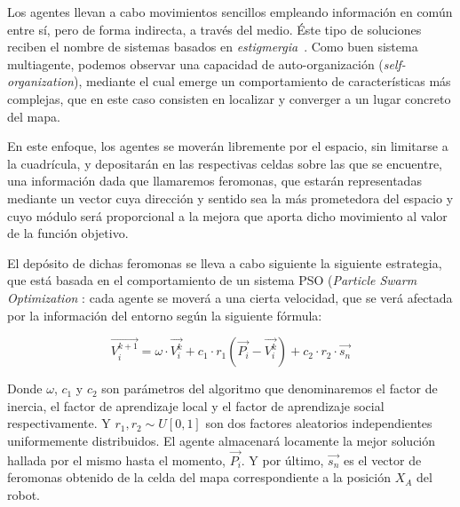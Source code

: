 \documentclass[runningheads]{llncs}
\begin{document}
    Los agentes llevan a cabo movimientos sencillos empleando información en común entre sí, pero de forma indirecta,
    a través del medio. Éste tipo de soluciones reciben el nombre de sistemas basados en
    \textit{estigmergia}~\cite{stigmergy}.
    Como buen sistema multiagente, podemos observar una capacidad de auto-organización (\textit{self-organization}),
    mediante el cual emerge un comportamiento de características más complejas, que en este caso consisten en localizar
    y converger a un lugar concreto del mapa.

    En este enfoque, los agentes se moverán libremente por el espacio, sin limitarse a la cuadrícula, y depositarán
    en las respectivas celdas sobre las que se encuentre, una información dada que llamaremos feromonas, que estarán
    representadas mediante un vector cuya dirección y sentido sea la más prometedora del espacio y cuyo módulo será
    proporcional a la mejora que aporta dicho movimiento al valor de la función objetivo.

    El depósito de dichas feromonas se lleva a cabo siguiente la siguiente estrategia, que está basada en el
    comportamiento de un sistema PSO (\textit{Particle Swarm Optimization} \cite{PSO}: cada agente se moverá a una
    cierta velocidad, que se verá afectada por la información del entorno según la siguiente fórmula:


    \[
        \vec{V_i^{k+1}} = \omega \cdot \vec{V_i^k} + c_1 \cdot r_1(\vec{P_i} - \vec{V_i^k}) + c_2 \cdot r_2 \cdot \vec{s_n}
    \]

    Donde $\omega$, $c_1$ y $c_2$ son parámetros del algoritmo que denominaremos el factor de inercia, el factor de
    aprendizaje local y el factor de aprendizaje social respectivamente. Y $r_1, r_2 \sim U[0,1]$ son dos factores
    aleatorios independientes uniformemente distribuidos.
    El agente almacenará locamente la mejor solución hallada por el mismo hasta el momento, $\vec{P_i}$.
    Y por último, $\vec{s_n}$ es el vector de feromonas obtenido de la celda del mapa correspondiente a la
    posición $X_A$ del robot.
\end{document}
